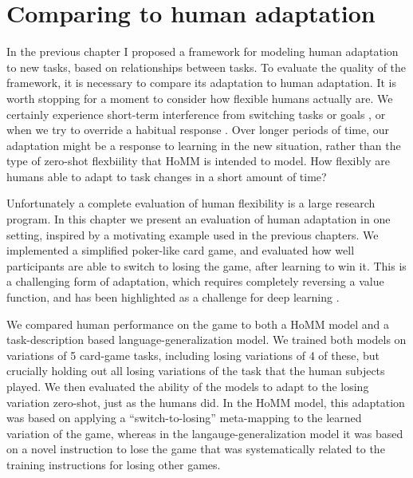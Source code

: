 \chapter{Comparing to human adaptation} \label{chapter:human}

In the previous chapter I proposed a framework for modeling human adaptation to new tasks, based on relationships between tasks. To evaluate the quality of the framework, it is necessary to compare its adaptation to human adaptation. It is worth stopping for a moment to consider how flexible humans actually are. We certainly experience short-term interference from switching tasks or goals \citep{Rogers1995}, or when we try to override a habitual response \citep{Stroop1935, MacLeod1991}. Over longer periods of time, our adaptation might be a response to learning in the new situation, rather than the type of zero-shot flexbiility that HoMM is intended to model. How flexibly are humans able to adapt to task changes in a short amount of time? \par
Unfortunately a complete evaluation of human flexibility is a large research program. In this chapter we present an evaluation of human adaptation in one setting, inspired by a motivating example used in the previous chapters. We implemented a simplified poker-like card game, and evaluated how well participants are able to switch to losing the game, after learning to win it. This is a challenging form of adaptation, which requires completely reversing a value function, and has been highlighted as a challenge for deep learning \citep{Lake2016}.\par
We compared human performance on the game to both a HoMM model and a task-description based language-generalization model. We trained both models on variations of 5 card-game tasks, including losing variations of 4 of these, but crucially holding out all losing variations of the task that the human subjects played. We then evaluated the ability of the models to adapt to the losing variation zero-shot, just as the humans did. In the HoMM model, this adaptation was based on applying a ``switch-to-losing'' meta-mapping to the learned variation of the game, whereas in the langauge-generalization model it was based on a novel instruction to lose the game that was systematically related to the training instructions for losing other games.\par 

